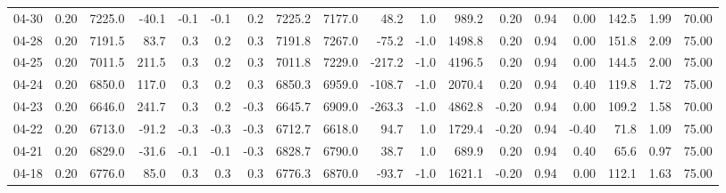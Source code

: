 \begin{threeparttable}
{\begin{tabular}{lrrrrrrrrrrrrrrrrr}
  04-30 &     0.20 & 7225.0 &             -40.1 &              -0.1 &               -0.1 &                0.2 & 7225.2 & 7177.0 &       48.2 &                      1.0 &               989.2 &       0.20 &      0.94 &           0.00 &            142.5 &            1.99 &                  70.00 \\
  04-28 &     0.20 & 7191.5 &              83.7 &               0.3 &                0.2 &                0.3 & 7191.8 & 7267.0 &      -75.2 &                     -1.0 &              1498.8 &       0.20 &      0.94 &           0.00 &            151.8 &            2.09 &                  75.00 \\
  04-25 &     0.20 & 7011.5 &             211.5 &               0.3 &                0.2 &                0.3 & 7011.8 & 7229.0 &     -217.2 &                     -1.0 &              4196.5 &       0.20 &      0.94 &           0.00 &            144.5 &            2.00 &                  75.00 \\
  04-24 &     0.20 & 6850.0 &             117.0 &               0.3 &                0.2 &                0.3 & 6850.3 & 6959.0 &     -108.7 &                     -1.0 &              2070.4 &       0.20 &      0.94 &           0.40 &            119.8 &            1.72 &                  75.00 \\
  04-23 &     0.20 & 6646.0 &             241.7 &               0.3 &                0.2 &               -0.3 & 6645.7 & 6909.0 &     -263.3 &                     -1.0 &              4862.8 &      -0.20 &      0.94 &           0.00 &            109.2 &            1.58 &                  70.00 \\
  04-22 &     0.20 & 6713.0 &             -91.2 &              -0.3 &               -0.3 &               -0.3 & 6712.7 & 6618.0 &       94.7 &                      1.0 &              1729.4 &      -0.20 &      0.94 &          -0.40 &             71.8 &            1.09 &                  75.00 \\
  04-21 &     0.20 & 6829.0 &             -31.6 &              -0.1 &               -0.1 &               -0.3 & 6828.7 & 6790.0 &       38.7 &                      1.0 &               689.9 &       0.20 &      0.94 &           0.40 &             65.6 &            0.97 &                  75.00 \\
  04-18 &     0.20 & 6776.0 &              85.0 &               0.3 &                0.3 &                0.3 & 6776.3 & 6870.0 &      -93.7 &                     -1.0 &              1621.1 &      -0.20 &      0.94 &           0.00 &            112.1 &            1.63 &                  75.00 \\

\end{tabular}}
\end{threeparttable}
